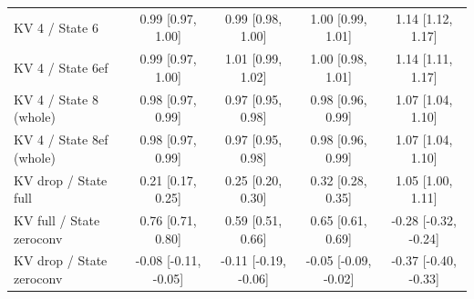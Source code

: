 \begin{tabular}{lcccc}
KV 4 / State 6 & 0.99 {\scriptsize[0.97, 1.00]} & 0.99 {\scriptsize[0.98, 1.00]} & 1.00 {\scriptsize[0.99, 1.01]} & 1.14 {\scriptsize[1.12, 1.17]} \\
KV 4 / State 6ef & 0.99 {\scriptsize[0.97, 1.00]} & 1.01 {\scriptsize[0.99, 1.02]} & 1.00 {\scriptsize[0.98, 1.01]} & 1.14 {\scriptsize[1.11, 1.17]} \\
KV 4 / State 8 (whole) & 0.98 {\scriptsize[0.97, 0.99]} & 0.97 {\scriptsize[0.95, 0.98]} & 0.98 {\scriptsize[0.96, 0.99]} & 1.07 {\scriptsize[1.04, 1.10]} \\
KV 4 / State 8ef (whole) & 0.98 {\scriptsize[0.97, 0.99]} & 0.97 {\scriptsize[0.95, 0.98]} & 0.98 {\scriptsize[0.96, 0.99]} & 1.07 {\scriptsize[1.04, 1.10]} \\
KV drop / State full & 0.21 {\scriptsize[0.17, 0.25]} & 0.25 {\scriptsize[0.20, 0.30]} & 0.32 {\scriptsize[0.28, 0.35]} & 1.05 {\scriptsize[1.00, 1.11]} \\
KV full / State zeroconv & 0.76 {\scriptsize[0.71, 0.80]} & 0.59 {\scriptsize[0.51, 0.66]} & 0.65 {\scriptsize[0.61, 0.69]} & -0.28 {\scriptsize[-0.32, -0.24]} \\
KV drop / State zeroconv & -0.08 {\scriptsize[-0.11, -0.05]} & -0.11 {\scriptsize[-0.19, -0.06]} & -0.05 {\scriptsize[-0.09, -0.02]} & -0.37 {\scriptsize[-0.40, -0.33]} \\
\bottomrule
\end{tabular}
